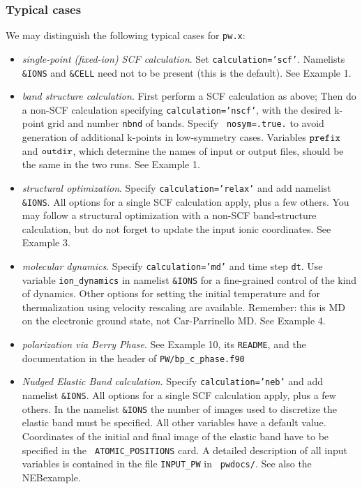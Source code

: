 \documentclass[12pt]{article}
\begin{document}
\subsubsection{Typical cases}

We may distinguish the following typical cases for 
{\tt pw.x}:
\begin{itemize}
\item {\em single-point (fixed-ion) SCF calculation}.
      Set {\tt calculation='scf'}. Namelists {\tt \&IONS}
      and {\tt \&CELL} need not to be present (this is the default).
      See Example 1.
\item {\em band structure calculation}.  
      First perform a SCF calculation as above; Then do a non-SCF
      calculation specifying {\tt calculation='nscf'}, with the desired
      k-point grid and number {\tt nbnd} of bands.  Specify {\tt
      nosym=.true.} to avoid generation of additional k-points in
      low-symmetry cases.  Variables ${\tt prefix}$ and ${\tt outdir}$,
      which determine the names of input or output files, should be the
      same in the two runs.  See Example 1.
\item {\em structural optimization}.
      Specify {\tt calculation='relax'} and add namelist {\tt \&IONS}.
      All options for a single SCF calculation apply, plus a few others.
      You may follow a structural optimization with a non-SCF
      band-structure calculation, but do not forget to update the input
      ionic coordinates.  See Example 3.
\item {\em molecular dynamics}.
      Specify {\tt calculation='md'} and time step {\tt dt}.  Use
      variable {\tt ion\_dynamics} in namelist {\tt \&IONS} for a
      fine-grained control of the kind of dynamics.  Other options for
      setting the initial temperature and for thermalization using
      velocity rescaling are available.  Remember: this is MD on the
      electronic ground state, not Car-Parrinello MD. See Example 4.
\item {\em polarization via Berry Phase}.
      See Example 10, its {\tt README}, and the documentation in the
      header of {\tt PW/bp\_c\_phase.f90}
\item {\em Nudged Elastic Band calculation}.
      Specify {\tt calculation='neb'} and add namelist {\tt \&IONS}.
      All options for a single SCF calculation apply, plus a few others.
      In the namelist {\tt \&IONS} the number of images used to
      discretize the elastic band must be specified. All other variables
      have a default value.  Coordinates of the initial and final image
      of the elastic band have to be specified in the {\tt
      ATOMIC\_POSITIONS} card.  A detailed description of all input
      variables is contained in the file {\tt INPUT\_PW} in {\tt
      pwdocs/}.  See also the NEBexample.
      
\end{itemize}
\end{document}
